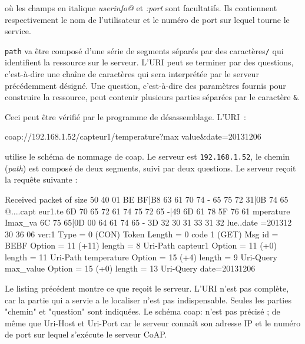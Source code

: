 \noindent où les champs en italique \textit{userinfo@} et \textit{:port} sont facultatifs. Ils contiennent respectivement le nom de l’utilisateur et le numéro de port sur lequel tourne le service.

         \vspace{1em}

\texttt{path} va être composé d’une série de segments séparés par des caractères\texttt{/} qui identifient la ressource sur le serveur. L’URI peut se terminer par des questions, c’est-à-dire une chaîne de caractères qui sera interprétée par le serveur précédemment désigné. Une question, c'est-à-dire des paramètres fournis pour construire la ressource, peut contenir plusieurs parties séparées par le caractère \texttt{&}.

         \vspace{1em}

Ceci peut être vérifié par le programme de désassemblage. L’URI~:

\begin{termc}[backgroundcolor=\color{blue!10}, basicstyle=\ttfamily\small, escapechar=@]
coap://192.168.1.52/capteur1/temperature?max value&date=20131206
\end{termc}

\noindent utilise le schéma de nommage de coap. Le serveur est \texttt{192.168.1.52}, le chemin (\textit{path}) est composé de deux segments, suivi par deux questions. Le serveur reçoit la requête suivante : 

\begin{termc}[backgroundcolor=\color{blue!10}, basicstyle=\ttfamily\small, , escapechar=#]
Received packet of size 50
40 01 BE BF|B8 63 61 70 74  - 65 75 72 31|0B 74 65 @....capt eur1.te
6D 70 65 72 61 74 75 72 65  -|49 6D 61 78 5F 76 61 mperature Imax_va
6C 75 65|0D 00 64 61 74 65  - 3D 32 30 31 33 31 32 lue..date =201312
30 36                                              06
ver:1 Type = 0 (CON) Token Length = 0 code 1 (GET) Msg id = BEBF
Option = 11 (+11) length = 8
Uri-Path capteur1
Option = 11 (+0) length = 11
Uri-Path temperature
Option = 15 (+4) length = 9
Uri-Query max_value
Option = 15 (+0) length = 13
Uri-Query date=20131206
\end{termc}


Le listing précédent montre ce que reçoit le serveur. L'URI n'est pas complète, car la partie qui a servie a le localiser n'est pas indispensable. Seules les parties "chemin" et "question" sont indiquées. Le schéma coap: n’est pas précisé ; de même que Uri-Host et Uri-Port car le serveur connaît son adresse IP et le numéro de port sur lequel s’exécute le serveur CoAP.

